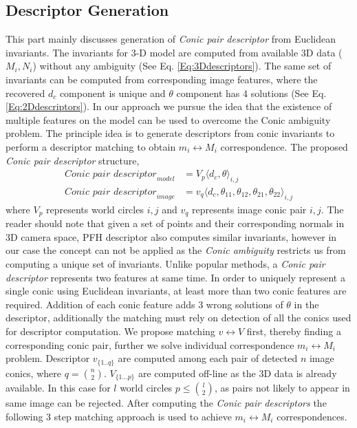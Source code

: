 \documentclass{bmvc2k}
\begin{document}
\subsection{Descriptor Generation}
This part mainly discusses generation of \textit{Conic pair descriptor} from Euclidean invariants. 
The invariants for 3-D model are computed from available 3D data ($M_i,N_i$) without any ambiguity (See Eq. \ref{Eq:3Ddescriptors}). 
The same set of invariants can be computed from corresponding image features, where the recovered $ d_c $ component is unique and $ \theta $ component has 4 solutions (See Eq. \ref{Eq:2Ddescriptors}). 
In our approach we pursue the idea that the existence of multiple features on the model can be used to overcome the Conic ambiguity problem. 
The principle idea is to generate descriptors from conic invariants to perform a descriptor matching to obtain $ m_i \leftrightarrow M_i $ correspondence.
The proposed \textit{Conic pair descriptor} structure,
\begin{align}
\textit{Conic pair descriptor}_{model} &= V_{p} \langle d_c,\theta \rangle_{i,j} \label{Eq:3Ddescriptors} \\
\textit{Conic pair descriptor}_{image} &= v_{q} \langle  d_c,\theta_{11},\theta_{12},\theta_{21},\theta_{22} \rangle_{i,j} \label{Eq:2Ddescriptors} 
\end{align}
where $V_{p}$ represents world circles $i,j$ and $v_{q}$ represents image conic pair $i,j$. 
The reader should note that given a set of points and their corresponding normals in 3D camera space, PFH descriptor \cite{RusuDoctoralDissertation} also computes similar invariants, however in our case the concept can not be applied as the \textit{Conic ambiguity} restricts us from computing a unique set of invariants. 
Unlike popular methods, a \textit{Conic pair descriptor} represents two features at same time. 
In order to uniquely represent a single conic using Euclidean invariants, at least more than two conic features are required. 
Addition of each conic feature adds 3 wrong solutions of $ \theta $ in the descriptor, additionally the matching must rely on detection of all the conics used for descriptor computation. 
We propose matching $ v \leftrightarrow V $ first, thereby finding a corresponding conic pair, further we solve individual correspondence $ m_i \leftrightarrow M_i $ problem. 
Descriptor $ v_{\{1..q\}} $ are computed among each pair of detected $ n $ image conics, where $ q = \binom{n}{2} $. 
$ V_{\{1...p\}} $ are computed off-line as the 3D data is already available. In this case for $ l $ world circles  $ p \leq \binom{l}{2} $, as pairs not likely to appear in same image can be rejected. 
After computing the \textit{Conic pair descriptors} the following 3 step matching approach is used to achieve $ m_i \leftrightarrow M_i $ correspondences. 
\end{document}
